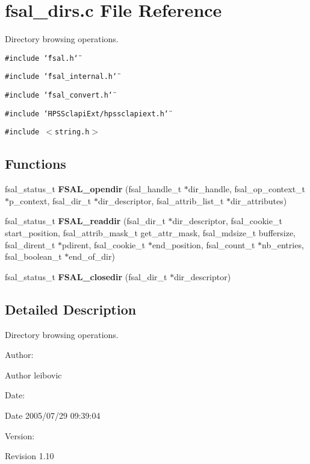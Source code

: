 \section{fsal\_\-dirs.c File Reference}
\label{fsal__dirs_8c}
Directory browsing operations. 

{\tt \#include \char`\"{}fsal.h\char`\"{}}\par
{\tt \#include \char`\"{}fsal\_\-internal.h\char`\"{}}\par
{\tt \#include \char`\"{}fsal\_\-convert.h\char`\"{}}\par
{\tt \#include \char`\"{}HPSSclapi\-Ext/hpssclapiext.h\char`\"{}}\par
{\tt \#include $<$string.h$>$}\par
\subsection*{Functions}
\begin{CompactItemize}
\item 
fsal\_\-status\_\-t {\bf FSAL\_\-opendir} (fsal\_\-handle\_\-t $\ast$dir\_\-handle, fsal\_\-op\_\-context\_\-t $\ast$p\_\-context, fsal\_\-dir\_\-t $\ast$dir\_\-descriptor, fsal\_\-attrib\_\-list\_\-t $\ast$dir\_\-attributes)
\item 
fsal\_\-status\_\-t {\bf FSAL\_\-readdir} (fsal\_\-dir\_\-t $\ast$dir\_\-descriptor, fsal\_\-cookie\_\-t start\_\-position, fsal\_\-attrib\_\-mask\_\-t get\_\-attr\_\-mask, fsal\_\-mdsize\_\-t buffersize, fsal\_\-dirent\_\-t $\ast$pdirent, fsal\_\-cookie\_\-t $\ast$end\_\-position, fsal\_\-count\_\-t $\ast$nb\_\-entries, fsal\_\-boolean\_\-t $\ast$end\_\-of\_\-dir)
\item 
fsal\_\-status\_\-t {\bf FSAL\_\-closedir} (fsal\_\-dir\_\-t $\ast$dir\_\-descriptor)
\end{CompactItemize}


\subsection{Detailed Description}
Directory browsing operations. 

\begin{Desc}
\item[Author:]\begin{Desc}
\item[Author]leibovic \end{Desc}
\end{Desc}
\begin{Desc}
\item[Date:]\begin{Desc}
\item[Date]2005/07/29 09:39:04 \end{Desc}
\end{Desc}
\begin{Desc}
\item[Version:]\begin{Desc}
\item[Revision]1.10 \end{Desc}
\end{Desc}


